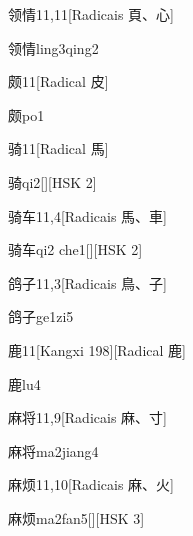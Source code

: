 \begin{entry}{领情}{11,11}[Radicais ⾴、⼼]
  \begin{phonetics}{领情}{ling3qing2}
  \end{phonetics}
\end{entry}

\begin{entry}{颇}{11}[Radical ⽪]
  \begin{phonetics}{颇}{po1}
  \end{phonetics}
\end{entry}

\begin{entry}{骑}{11}[Radical ⾺]
  \begin{phonetics}{骑}{qi2}[][HSK 2]
  \end{phonetics}
\end{entry}

\begin{entry}{骑车}{11,4}[Radicais ⾺、⾞]
  \begin{phonetics}{骑车}{qi2 che1}[][HSK 2]
  \end{phonetics}
\end{entry}

\begin{entry}{鸽子}{11,3}[Radicais ⿃、⼦]
  \begin{phonetics}{鸽子}{ge1zi5}
  \end{phonetics}
\end{entry}

\begin{entry}{鹿}{11}[Kangxi 198][Radical ⿅]
  \begin{phonetics}{鹿}{lu4}
  \end{phonetics}
\end{entry}

\begin{entry}{麻将}{11,9}[Radicais ⿇、⼨]
  \begin{phonetics}{麻将}{ma2jiang4}
  \end{phonetics}
\end{entry}

\begin{entry}{麻烦}{11,10}[Radicais ⿇、⽕]
  \begin{phonetics}{麻烦}{ma2fan5}[][HSK 3]
  \end{phonetics}
\end{entry}

